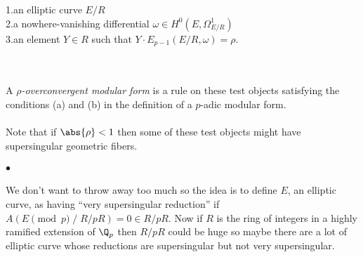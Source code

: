\documentclass[12pt]{article}
\begin{document}
\begin{minipage}[c]{6in}
1.\en an elliptic curve $E/R$\\
2.\en a nowhere-vanishing differential $\omega \in H^0(E,\Omega^1_{E/R})$\\
3.\en an element $Y \in R$ such that $Y \cdot E_{p-1}(E/R,\omega) = \rho$.
\end{minipage}
\\
\\
A \emph{$\rho$-overconvergent modular form} is a rule on these test objects
satisfying the conditions (a) and (b) in the definition of a $p$-adic
modular form.
\\
\\
Note that if $\abs{\rho} < 1$ then some of these test objects might have
supersingular geometric fibers.

\paragraph{$\bullet$}
We don't want to throw away too much so the idea is to define $E$, an
elliptic curve, as having ``very supersingular reduction'' if
$A(E\!\!\!\pmod{p}\;/\; R/pR ) = 0 \in R/pR$.
Now if $R$ is the ring of integers in a highly ramified extension of $\Q_p$
then $R/pR$ could be huge so maybe there are a lot of elliptic curve whose
reductions are supersingular but not very supersingular.
\end{document}
